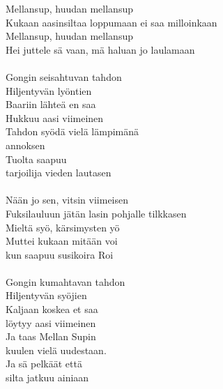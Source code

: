 
            Mellansup, huudan mellansup \\
            Kukaan aasinsiltaa loppumaan ei saa milloinkaan \\
            Mellansup, huudan mellansup \\
            Hei juttele sä vaan, mä haluan jo laulamaan \\
\hspace{10mm} \\
            Gongin seisahtuvan tahdon \\
            Hiljentyvän lyöntien \\
            Baariin lähteä en saa \\
            Hukkuu aasi viimeinen \\
            Tahdon syödä vielä lämpimänä \\
            annoksen \\
            Tuolta saapuu \\
            tarjoilija vieden lautasen \\
\hspace{10mm} \\
            Nään jo sen, vitsin viimeisen \\
            Fuksilauluun jätän lasin pohjalle tilkkasen \\
            Mieltä syö, kärsimysten yö \\
            Muttei kukaan mitään voi \\
            kun saapuu susikoira Roi \\
\hspace{10mm} \\
            Gongin kumahtavan tahdon \\
            Hiljentyvän syöjien \\
            Kaljaan koskea et saa \\
            löytyy aasi viimeinen \\
            Ja taas Mellan Supin \\
            kuulen vielä uudestaan. \\
            Ja sä pelkäät että \\
            silta jatkuu ainiaan \\
